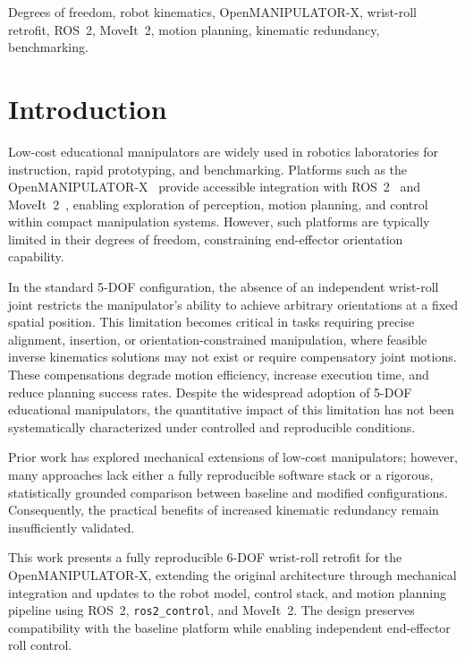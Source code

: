 \documentclass[conference]{IEEEtran}
\begin{document}
	\begin{IEEEkeywords}
		Degrees of freedom, robot kinematics, OpenMANIPULATOR-X,
		wrist-roll retrofit, ROS~2, MoveIt~2, motion planning,
		kinematic redundancy, benchmarking.
	\end{IEEEkeywords}
	
	\section{Introduction}
	\label{sec:introduction}
	
	Low-cost educational manipulators are widely used in robotics
	laboratories for instruction, rapid prototyping, and benchmarking.
	Platforms such as the OpenMANIPULATOR-X~\cite{robotis2023openmanipulator}
	provide accessible integration with ROS~2~\cite{al2024ros} and
	MoveIt~2~\cite{chitta2016moveit}, enabling exploration of perception,
	motion planning, and control within compact manipulation systems.
	However, such platforms are typically limited in their degrees of
	freedom, constraining end-effector orientation capability.
	
	In the standard 5-DOF configuration, the absence of an independent
	wrist-roll joint restricts the manipulator's ability to achieve
	arbitrary orientations at a fixed spatial position. This limitation
	becomes critical in tasks requiring precise alignment, insertion, or
	orientation-constrained manipulation, where feasible inverse kinematics
	solutions may not exist or require compensatory joint motions. These
	compensations degrade motion efficiency, increase execution time, and
	reduce planning success rates. Despite the widespread adoption of 5-DOF
	educational manipulators, the quantitative impact of this limitation
	has not been systematically characterized under controlled and
	reproducible conditions.
	
	Prior work has explored mechanical extensions of low-cost manipulators;
	however, many approaches lack either a fully reproducible software stack
	or a rigorous, statistically grounded comparison between baseline and
	modified configurations. Consequently, the practical benefits of
	increased kinematic redundancy remain insufficiently validated.
	
	This work presents a fully reproducible 6-DOF wrist-roll retrofit for
	the OpenMANIPULATOR-X, extending the original architecture through
	mechanical integration and updates to the robot model, control stack,
	and motion planning pipeline using ROS~2, \texttt{ros2\_control}, and
	MoveIt~2. The design preserves compatibility with the baseline platform
	while enabling independent end-effector roll control.
	
\end{document}
